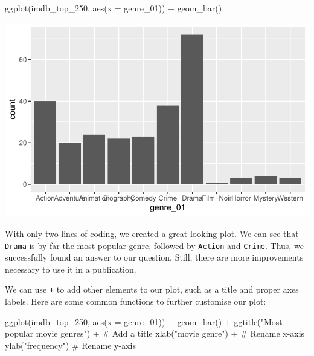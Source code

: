 \documentclass[
  letterpaper,
]{krantz}
\makeatletter
\newenvironment{Shaded}{\begin{snugshade}}{\end{snugshade}}
\newcommand{\AttributeTok}[1]{\textcolor[rgb]{0.40,0.45,0.13}{#1}}
\newcommand{\CommentTok}[1]{\textcolor[rgb]{0.37,0.37,0.37}{#1}}
\newcommand{\FunctionTok}[1]{\textcolor[rgb]{0.28,0.35,0.67}{#1}}
\newcommand{\NormalTok}[1]{\textcolor[rgb]{0.00,0.23,0.31}{#1}}
\newcommand{\SpecialCharTok}[1]{\textcolor[rgb]{0.37,0.37,0.37}{#1}}
\newcommand{\StringTok}[1]{\textcolor[rgb]{0.13,0.47,0.30}{#1}}
\newenvironment{kframe}{%
\medskip{}
\setlength{\fboxsep}{.8em}
 \def\at@end@of@kframe{}%
 \ifinner\ifhmode%
  \def\at@end@of@kframe{\end{minipage}}%
  \begin{minipage}{\columnwidth}%
 \fi\fi%
 \def\FrameCommand##1{\hskip\@totalleftmargin \hskip-\fboxsep
 \colorbox{shadecolor}{##1}\hskip-\fboxsep
     \hskip-\linewidth \hskip-\@totalleftmargin \hskip\columnwidth}%
 \MakeFramed {\advance\hsize-\width
   \@totalleftmargin\z@ \linewidth\hsize
   \@setminipage}}%
 {\par\unskip\endMakeFramed%
 \at@end@of@kframe}
\renewenvironment{Shaded}{\begin{kframe}}{\end{kframe}}
\makeatother
\begin{document}
\begin{Shaded}
\begin{Highlighting}[]
\FunctionTok{ggplot}\NormalTok{(imdb\_top\_250, }\FunctionTok{aes}\NormalTok{(}\AttributeTok{x =}\NormalTok{ genre\_01)) }\SpecialCharTok{+}
  \FunctionTok{geom\_bar}\NormalTok{()}
\end{Highlighting}
\end{Shaded}

\includegraphics{08_descriptive_statistics_files/figure-pdf/most-popular-genre-with-barplot-1.pdf}

With only two lines of coding, we created a great looking plot. We can
see that \texttt{Drama} is by far the most popular genre, followed by
\texttt{Action} and \texttt{Crime}. Thus, we successfully found an
answer to our question. Still, there are more improvements necessary to
use it in a publication.

We can use \texttt{+} to add other elements to our plot, such as a title
and proper axes labels. Here are some common functions to further
customise our plot:

\begin{Shaded}
\begin{Highlighting}[]
\FunctionTok{ggplot}\NormalTok{(imdb\_top\_250, }\FunctionTok{aes}\NormalTok{(}\AttributeTok{x =}\NormalTok{ genre\_01)) }\SpecialCharTok{+}
  \FunctionTok{geom\_bar}\NormalTok{() }\SpecialCharTok{+}
  \FunctionTok{ggtitle}\NormalTok{(}\StringTok{"Most popular movie genres"}\NormalTok{) }\SpecialCharTok{+}  \CommentTok{\# Add a title}
  \FunctionTok{xlab}\NormalTok{(}\StringTok{"movie genre"}\NormalTok{) }\SpecialCharTok{+}                   \CommentTok{\# Rename x{-}axis}
  \FunctionTok{ylab}\NormalTok{(}\StringTok{"frequency"}\NormalTok{)                       }\CommentTok{\# Rename y{-}axis}
\end{Highlighting}
\end{Shaded}
\end{document}
